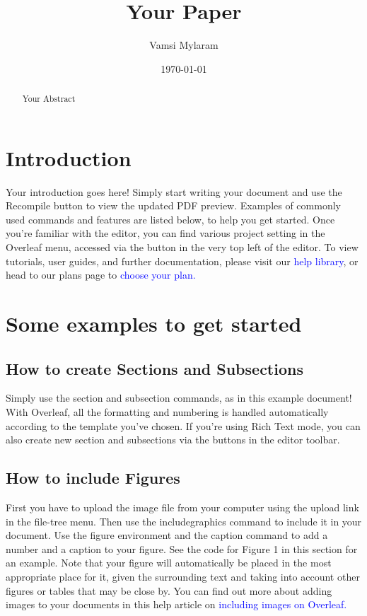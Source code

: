 \documentclass{article}
\title{Your Paper}
\author{Vamsi Mylaram}
\date{\today}
\begin{document}
	\maketitle
	
	\begin{abstract}
		Your Abstract
	\end{abstract}

\section{Introduction}
Your introduction goes here! Simply start writing your document and use the Recompile button to
view the updated PDF preview. Examples of commonly used commands and features are listed below,
to help you get started.
Once you’re familiar with the editor, you can find various project setting in the Overleaf menu,
accessed via the button in the very top left of the editor. To view tutorials, user guides, and further
documentation, please visit our {\textcolor{blue}{help library}}, or head to our plans page to {\textcolor{blue}{choose your plan.}}


\section{Some examples to get started}
\subsection{How to create Sections and Subsections}
Simply use the section and subsection commands, as in this example document! With Overleaf, all
the formatting and numbering is handled automatically according to the template you’ve chosen. If
you’re using Rich Text mode, you can also create new section and subsections via the buttons in the
editor toolbar.

\subsection{How to include Figures}
First you have to upload the image file from your computer using the upload link in the file-tree menu.
Then use the includegraphics command to include it in your document. Use the figure environment
and the caption command to add a number and a caption to your figure. See the code for Figure 1 in
this section for an example.
Note that your figure will automatically be placed in the most appropriate place for it, given the
surrounding text and taking into account other figures or tables that may be close by. You can find
out more about adding images to your documents in this help article on {\textcolor{blue}{including images on Overleaf.}}
\end{document}
